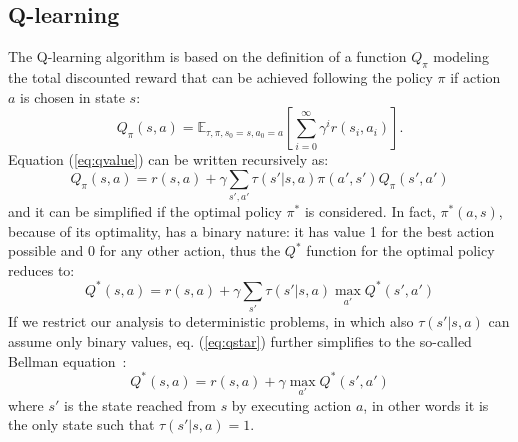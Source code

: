 \documentclass{article}
\begin{document}
\subsection{Q-learning}
\label{subsec:qlearning}
The Q-learning algorithm is based on the definition of a function $Q_\pi$ modeling the total discounted reward that can be achieved following the policy $\pi$ if action $a$ is chosen in state $s$:
\begin{equation}
Q_\pi (s,a) = \mathbb{E}_{\tau,\pi,s_0=s,a_0=a} \left[ \sum_{i=0}^\infty \gamma^i r(s_i,a_i) \right].
\label{eq:qvalue}
\end{equation}
Equation (\ref{eq:qvalue}) can be written recursively as:
\begin{equation}
Q_\pi (s,a) = r(s,a) + \gamma \sum_{s',a'} \tau(s'|s,a) \pi(a',s') Q_\pi(s',a')
\label{eq:qrecursive}
\end{equation}
and it can be simplified if the optimal policy $\pi^*$ is considered. In fact, $\pi^*(a,s)$, because of its optimality, has a binary nature: it has value 1 for the best action possible and 0 for any other action, thus the $Q^*$ function for the optimal policy reduces to:
\begin{equation}
Q^*(s,a) = r(s,a) + \gamma \sum_{s'} \tau(s'|s,a) \max_{a'} Q^*(s',a')
\label{eq:qstar}
\end{equation}
If we restrict our analysis to deterministic problems, in which also $\tau(s'|s,a)$ can assume only binary values, eq. (\ref{eq:qstar}) further simplifies to the so-called Bellman equation~\cite{russell2016artificial}:
\begin{equation}
Q^*(s,a) = r(s,a) + \gamma \max_{a'} Q^*(s', a')
\label{eq:bellman}
\end{equation}
where $s'$ is the state reached from $s$ by executing action $a$, in other words it is the only state such that $\tau(s'|s,a)=1$. 
\end{document}
